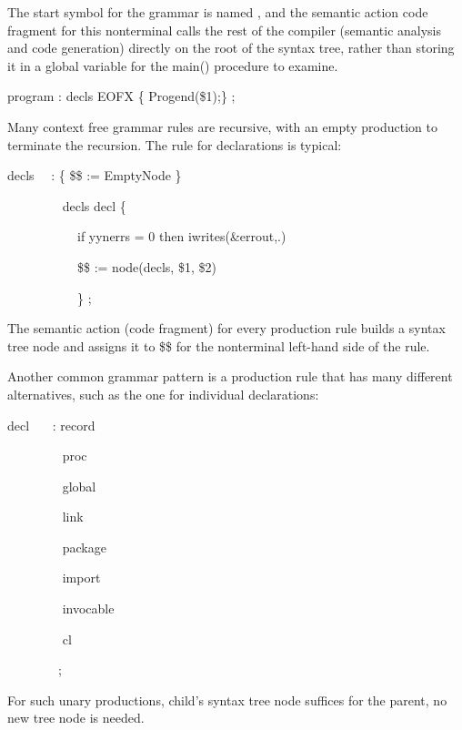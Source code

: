 The start symbol for the grammar is named
, and the semantic action code fragment
for this nonterminal calls the rest of the compiler (semantic analysis
and code generation) directly on the root of the syntax tree, rather
than storing it in a global variable for the main() procedure to
examine.

{\ttfamily\mdseries
program : decls EOFX \{ Progend(\$1);\} ;}


Many context free grammar rules are recursive, with an empty
production to terminate the recursion. The rule for declarations is
typical:

{\ttfamily\mdseries
decls \ \ : \{ \$\$ := EmptyNode \}}

{\ttfamily\mdseries
\ \ \ \ \ \ \ \ {\textbar} decls decl \{}

{\ttfamily\mdseries
\ \ \ \ \ \ \ \ \ \ \ if yynerrs = 0 then iwrites(\&errout,{\textquotedbl}.{\textquotedbl})}

{\ttfamily\mdseries
\ \ \ \ \ \ \ \ \ \ \ \$\$ := node({\textquotedbl}decls{\textquotedbl}, \$1, \$2)}

{\ttfamily\mdseries
\ \ \ \ \ \ \ \ \ \ \ \} ;}


The {\textquotedbl}semantic action{\textquotedbl} (code fragment) for
every production rule builds a syntax tree node and assigns it to \$\$
for the nonterminal left-hand side of the rule.

Another common grammar pattern is a production rule that has many
different alternatives, such as the one for individual declarations:

{\ttfamily\mdseries
decl \ \ \ : record}

{\ttfamily\mdseries
\ \ \ \ \ \ \ \ {\textbar} proc}

{\ttfamily\mdseries
\ \ \ \ \ \ \ \ {\textbar} global}

{\ttfamily\mdseries
\ \ \ \ \ \ \ \ {\textbar} link}

{\ttfamily\mdseries
\ \ \ \ \ \ \ \ {\textbar} package}

{\ttfamily\mdseries
\ \ \ \ \ \ \ \ {\textbar} import}

{\ttfamily\mdseries
\ \ \ \ \ \ \ \ {\textbar} invocable}

{\ttfamily\mdseries
\ \ \ \ \ \ \ \ {\textbar} cl}

{\ttfamily\mdseries
\ \ \ \ \ \ \ \ ;}


For such {\textquotedbl}unary{\textquotedbl} productions, child's
syntax tree node suffices for the parent, no new tree node is needed.

